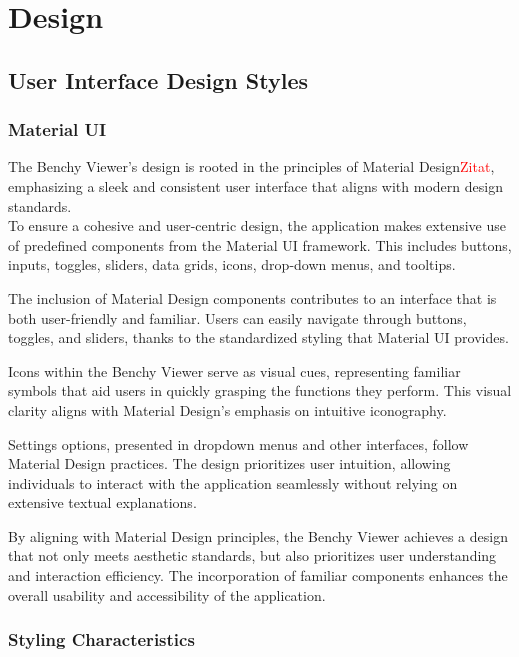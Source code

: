 
\section{Design}
\subsection{User Interface Design Styles}
\subsubsection{Material UI}
The Benchy Viewer's design is rooted in the principles of Material Design\textcolor{red}{Zitat}, emphasizing a sleek and consistent user interface that aligns with modern design standards.\\
To ensure a cohesive and user-centric design, the application makes extensive use of predefined components from the Material UI framework. This includes buttons, inputs, toggles, sliders, data grids, icons, drop-down menus, and tooltips.

The inclusion of Material Design components contributes to an interface that is both user-friendly and familiar. Users can easily navigate through buttons, toggles, and sliders, thanks to the standardized styling that Material UI provides.

Icons within the Benchy Viewer serve as visual cues, representing familiar symbols that aid users in quickly grasping the functions they perform. This visual clarity aligns with Material Design's emphasis on intuitive iconography.

Settings options, presented in dropdown menus and other interfaces, follow Material Design practices. The design prioritizes user intuition, allowing individuals to interact with the application seamlessly without relying on extensive textual explanations.

By aligning with Material Design principles, the Benchy Viewer achieves a design that not only meets aesthetic standards, but also prioritizes user understanding and interaction efficiency. The incorporation of familiar components enhances the overall usability and accessibility of the application.


\subsubsection{Styling Characteristics}

